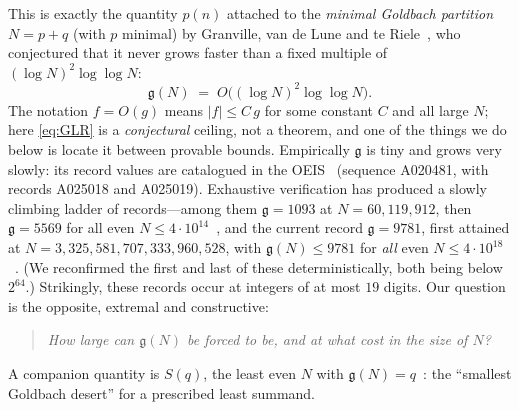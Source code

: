 \documentclass[11pt]{article}
\theoremstyle{plain}
\theoremstyle{definition}
\theoremstyle{remark}
\newcommand{\N}{N}
\newcommand{\g}{\mathfrak{g}}
\begin{document}
This is exactly the quantity $p(n)$ attached to the \emph{minimal Goldbach
partition} $\N=p+q$ (with $p$ minimal) by Granville, van de Lune and te
Riele~\cite{GLvdtR}, who conjectured that it never grows faster than a fixed
multiple of $(\log \N)^2\log\log \N$:
\begin{equation}\label{eq:GLR}
\g(\N)\;=\;O\bigl((\log \N)^2\log\log \N\bigr).
\end{equation}
The notation $f=O(g)$ means $|f|\le C\,g$ for some constant $C$ and all large
$\N$; here \eqref{eq:GLR} is a \emph{conjectural} ceiling, not a theorem, and one
of the things we do below is locate it between provable bounds.
Empirically $\g$ is tiny and grows very slowly: its record values are catalogued
in the OEIS~\cite{OEIS} (sequence A020481, with records A025018 and A025019).
Exhaustive verification has produced a slowly climbing ladder of records---among
them $\g=1093$ at $\N=60{,}119{,}912$, then $\g=5569$ for all even
$\N\le4\cdot10^{14}$~\cite{Richstein}, and the current record $\g=9781$, first
attained at $\N=3{,}325{,}581{,}707{,}333{,}960{,}528$, with $\g(\N)\le9781$ for
\emph{all} even $\N\le4\cdot10^{18}$~\cite{OeS}. (We reconfirmed the first and
last of these deterministically, both being below $2^{64}$.) Strikingly, these
records occur at integers of at most $19$ digits. Our question
is the opposite, extremal and constructive:
\begin{quote}\itshape
How large can $\g(\N)$ be forced to be, and at what cost in the size of $\N$?
\end{quote}
A companion quantity is $S(q)$, the least even $\N$ with $\g(\N)=q$~\cite{GLvdtR}:
the ``smallest Goldbach desert'' for a prescribed least summand.
\end{document}
